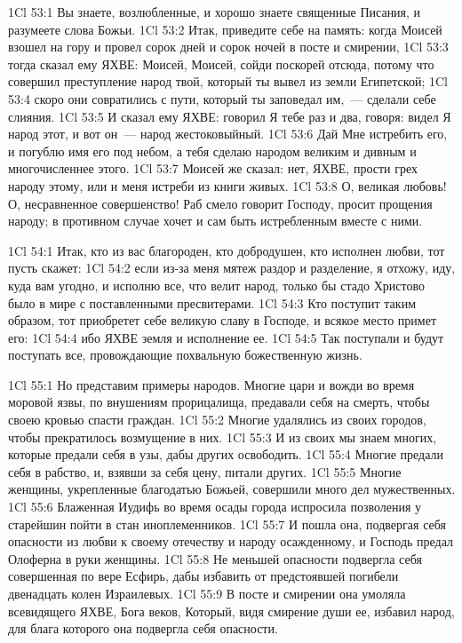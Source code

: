 \vs 1Cl 53:1
Вы знаете, возлюбленные,
и хорошо знаете священные Писания, и разумеете слова Божьи.
\vs 1Cl 53:2
Итак, приведите себе на
память: когда Моисей взошел на гору и провел сорок дней и сорок ночей в посте
и смирении,
\vs 1Cl 53:3
тогда сказал ему ЯХВЕ:
Моисей, Моисей, сойди поскорей отсюда, потому что совершил преступление народ
твой, который ты вывел из земли Египетской;
\vs 1Cl 53:4
скоро они совратились с
пути, который ты заповедал им,~--- сделали себе слияния.
\vs 1Cl 53:5
И сказал ему ЯХВЕ: говорил
Я тебе раз и два, говоря: видел Я народ этот, и вот он~--- народ жестоковыйный.
\vs 1Cl 53:6
Дай Мне истребить его, и
погублю имя его под небом, а тебя сделаю народом великим и дивным и
многочисленнее этого.
\vs 1Cl 53:7
Моисей же сказал: нет,
ЯХВЕ, прости грех народу этому, или и меня истреби из книги живых.
\vs 1Cl 53:8
О, великая любовь! О,
несравненное совершенство! Раб смело говорит Господу, просит прощения народу;
в противном случае хочет и сам быть истребленным вместе с ними.

\vs 1Cl 54:1
Итак, кто из вас
благороден, кто добродушен, кто исполнен любви, тот пусть скажет:
\vs 1Cl 54:2
если из-за меня мятеж
раздор и разделение, я отхожу, иду, куда вам угодно, и исполню все, что велит
народ, только бы стадо Христово было в мире с поставленными пресвитерами.
\vs 1Cl 54:3
Кто поступит таким
образом, тот приобретет себе великую славу в Господе, и всякое место примет
его:
\vs 1Cl 54:4
ибо ЯХВЕ земля и
исполнение ее.
\vs 1Cl 54:5
Так поступали и будут
поступать все, провождающие похвальную божественную жизнь.

\vs 1Cl 55:1
Но представим примеры
народов. Многие цари и вожди во время моровой язвы, по внушениям прорицалища,
предавали себя на смерть, чтобы своею кровью спасти граждан.
\vs 1Cl 55:2
Многие удалялись из своих
городов, чтобы прекратилось возмущение в них.
\vs 1Cl 55:3
И из своих мы знаем
многих, которые предали себя в узы, дабы других освободить.
\vs 1Cl 55:4
Многие предали себя в
рабство, и, взявши за себя цену, питали других.
\vs 1Cl 55:5
Многие женщины,
укрепленные благодатью Божьей, совершили много дел мужественных.
\vs 1Cl 55:6
Блаженная Иудифь во время
осады города испросила позволения у старейшин пойти в стан иноплеменников.
\vs 1Cl 55:7
И пошла она, подвергая
себя опасности из любви к своему отечеству и народу осажденному, и Господь
предал Олоферна в руки женщины.
\vs 1Cl 55:8
Не меньшей опасности
подвергла себя совершенная по вере Есфирь, дабы избавить от предстоявшей
погибели двенадцать колен Израилевых.
\vs 1Cl 55:9
В посте и смирении она
умоляла всевидящего ЯХВЕ, Бога веков, Который, видя смирение души ее, избавил
народ, для блага которого она подвергла себя опасности.

